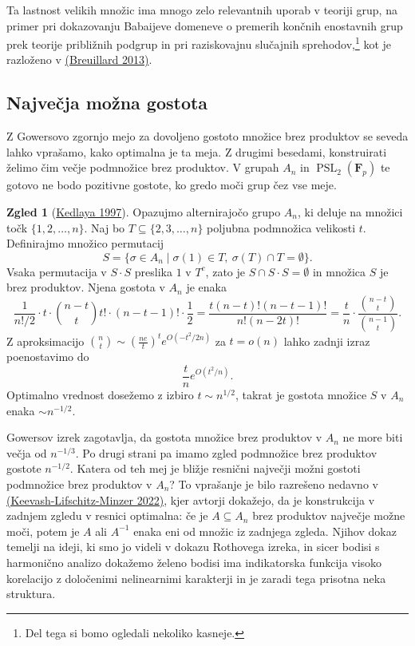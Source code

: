 \documentclass[11pt]{book}
\def\FF{\mathbf{F}}
\DeclareMathOperator\PSL{PSL}
\theoremstyle{definition}
\theoremstyle{zgled}
\newtheorem*{zgled}{Zgled}
\theoremstyle{odprtproblem}
\theoremstyle{domacanaloga}
\theoremstyle{izrek}
\begin{document}
Ta lastnost velikih množic ima mnogo zelo relevantnih uporab v teoriji grup, na primer pri dokazovanju Babaijeve domeneve o premerih končnih enostavnih grup prek teorije približnih podgrup in pri raziskovajnu slučajnih sprehodov,\footnote{Del tega si bomo ogledali nekoliko kasneje.} kot je razloženo v \href{http://library.msri.org/books/Book61/files/15breu.pdf}{(Breuillard 2013)}.

\subsection{Največja možna gostota}

Z Gowersovo zgornjo mejo za dovoljeno gostoto množice brez produktov se seveda lahko vprašamo, kako optimalna je ta meja. Z drugimi besedami, konstruirati želimo čim večje podmnožice brez produktov. V grupah $A_n$ in $\PSL_2(\FF_p)$ te gotovo ne bodo pozitivne gostote, ko gredo moči grup čez vse meje.

\begin{zgled}[\href{https://www.sciencedirect.com/science/article/pii/S0097316597927151}{Kedlaya 1997}]
Opazujmo alternirajočo grupo $A_n$, ki deluje na množici točk $\{ 1, 2, \dots, n \}$. Naj bo $T \subseteq \{2,3,\dots,n \}$ poljubna podmnožica velikosti $t$. Definirajmo množico permutacij
\[
S = \{ \sigma \in A_n \mid \sigma(1) \in T, \ \sigma(T) \cap T = \emptyset \}.
\]
Vsaka permutacija v $S \cdot S$ preslika $1$ v $T^c$, zato je $S \cap S \cdot S = \emptyset$ in množica $S$ je brez produktov. Njena gostota v $A_n$ je enaka
\[
  \frac{1}{n!/2} \cdot t \cdot \binom{n-t}{t} t! \cdot (n-t-1)! \cdot \frac{1}{2}
  = \frac{t (n-t)! (n-t-1)!}{n!(n-2t)!}
  = \frac{t}{n} \cdot \frac{\binom{n-t}{t}}{\binom{n-1}{t}}.
\]
Z aproksimacijo $\binom{n}{t} \sim (\frac{ne}{t})^t e^{O(- t^2/2n)}$ za $t = o(n)$ lahko zadnji izraz poenostavimo do 
\[
    \frac{t}{n} e^{O(t^2/n)}.
\]
Optimalno vrednost dosežemo z izbiro $t \sim n^{1/2}$, takrat je gostota množice $S$ v $A_n$ enaka $\sim n^{-1/2}$. 
\end{zgled}

Gowersov izrek zagotavlja, da gostota množice brez produktov v $A_n$ ne more biti večja od $n^{-1/3}$. Po drugi strani pa imamo zgled podmnožice brez produktov gostote $n^{-1/2}$. Katera od teh mej je bližje resnični največji možni gostoti podmnožice brez produktov v $A_n$? To vprašanje je bilo razrešeno nedavno v \href{https://arxiv.org/abs/2205.15191}{(Keevash-Lifschitz-Minzer 2022)}, kjer avtorji dokažejo, da je konstrukcija v zadnjem zgledu v resnici optimalna: če je $A \subseteq A_n$ brez produktov največje možne moči, potem je $A$ ali $A^{-1}$ enaka eni od množic iz zadnjega zgleda. Njihov dokaz temelji na ideji, ki smo jo videli v dokazu Rothovega izreka, in sicer bodisi s harmonično analizo dokažemo želeno bodisi ima indikatorska funkcija visoko korelacijo z določenimi nelinearnimi karakterji in je zaradi tega prisotna neka struktura.
\end{document}
